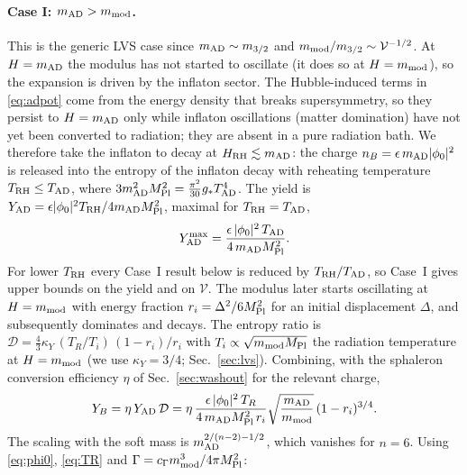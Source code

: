 \documentclass[11pt]{article}
\newcommand{\MP}{M_{\rm Pl}}
\begin{document}
\paragraph{Case I: $m_{\rm AD}>m_{\rm mod}$.} This is the generic LVS case since $m_{\rm AD}\sim m_{3/2}$ and $m_{\rm mod}/m_{3/2}\sim\mathcal V^{-1/2}$. At $H=m_{\rm AD}$ the modulus has not started to oscillate (it does so at $H=m_{\rm mod}$), so the expansion is driven by the inflaton sector. The Hubble-induced terms in \eqref{eq:adpot} come from the energy density that breaks supersymmetry, so they persist to $H=m_{\rm AD}$ only while inflaton oscillations (matter domination) have not yet been converted to radiation; they are absent in a pure radiation bath. We therefore take the inflaton to decay at $H_{\rm RH}\lesssim m_{\rm AD}$: the charge $n_B=\epsilon\,m_{\rm AD}|\phi_0|^2$ is released into the entropy of the inflaton decay with reheating temperature $T_{\rm RH}\le T_{\rm AD}$, where $3m_{\rm AD}^2\MP^2=\frac{\pi^2}{30}g_*T_{\rm AD}^4$. The yield is $Y_{\rm AD}=\epsilon|\phi_0|^2T_{\rm RH}/4m_{\rm AD}\MP^2$, maximal for $T_{\rm RH}=T_{\rm AD}$,
\begin{equation}
Y_{\rm AD}^{\max}=\frac{\epsilon\,|\phi_0|^2\,T_{\rm AD}}{4\,m_{\rm AD}\MP^2}.
\end{equation}
For lower $T_{\rm RH}$ every Case~I result below is reduced by $T_{\rm RH}/T_{\rm AD}$, so Case~I gives upper bounds on the yield and on $\mathcal V$. The modulus later starts oscillating at $H=m_{\rm mod}$ with energy fraction $r_i=\Delta^2/6\MP^2$ for an initial displacement $\Delta$, and subsequently dominates and decays. The entropy ratio is $\mathcal D=\tfrac43\kappa_Y\,(T_R/T_i)\,(1-r_i)/r_i$ with $T_i\propto\sqrt{m_{\rm mod}\MP}$ the radiation temperature at $H=m_{\rm mod}$ (we use $\kappa_Y=3/4$; Sec.~\ref{sec:lvs}). Combining, with the sphaleron conversion efficiency $\eta$ of Sec.~\ref{sec:washout} for the relevant charge,
\begin{equation}
Y_B=\eta\,Y_{\rm AD}\,\mathcal D=\eta\,\frac{\epsilon\,|\phi_0|^2\,T_R}{4\,m_{\rm AD}\MP^2\,r_i}\sqrt{\frac{m_{\rm AD}}{m_{\rm mod}}}\,(1-r_i)^{3/4}.\label{eq:YBI}
\end{equation}
The scaling with the soft mass is $m_{\rm AD}^{2/(n-2)-1/2}$, which vanishes for $n=6$. Using \eqref{eq:phi0}, \eqref{eq:TR} and $\Gamma=c_\Gamma m_{\rm mod}^3/4\pi\MP^2$:
\end{document}
